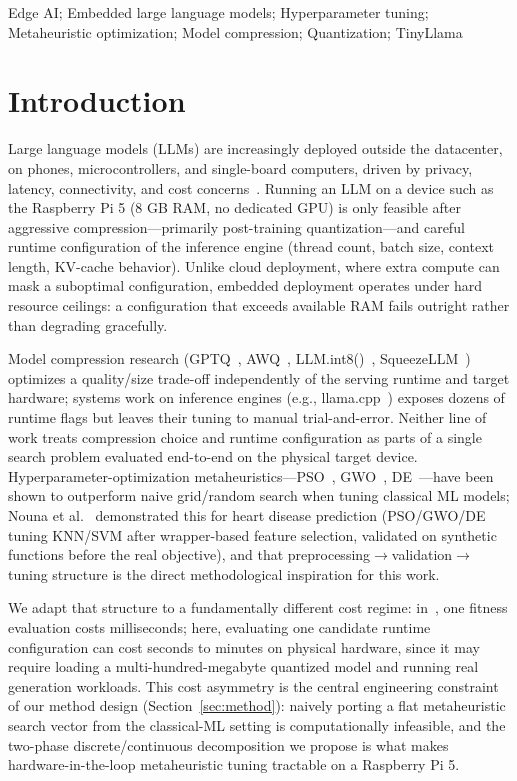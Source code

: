 \documentclass[conference, letterpaper]{IEEEtran}
\begin{document}
\begin{IEEEkeywords}
Edge AI; Embedded large language models; Hyperparameter tuning; Metaheuristic optimization; Model compression; Quantization; TinyLlama
\end{IEEEkeywords}

\section{Introduction}
\label{sec:introduction}

Large language models (LLMs) are increasingly deployed outside the datacenter, on phones, microcontrollers, and single-board computers, driven by privacy, latency, connectivity, and cost concerns~\cite{ref17}. Running an LLM on a device such as the Raspberry Pi 5 (8 GB RAM, no dedicated GPU) is only feasible after aggressive compression---primarily post-training quantization---and careful runtime configuration of the inference engine (thread count, batch size, context length, KV-cache behavior). Unlike cloud deployment, where extra compute can mask a suboptimal configuration, embedded deployment operates under hard resource ceilings: a configuration that exceeds available RAM fails outright rather than degrading gracefully.

Model compression research (GPTQ~\cite{ref4}, AWQ~\cite{ref5}, LLM.int8()~\cite{ref6}, SqueezeLLM~\cite{ref7}) optimizes a quality/size trade-off independently of the serving runtime and target hardware; systems work on inference engines (e.g., llama.cpp~\cite{ref3}) exposes dozens of runtime flags but leaves their tuning to manual trial-and-error. Neither line of work treats compression choice and runtime configuration as parts of a single search problem evaluated end-to-end on the physical target device. Hyperparameter-optimization metaheuristics---PSO~\cite{ref8}, GWO~\cite{ref9}, DE~\cite{ref10}---have been shown to outperform naive grid/random search when tuning classical ML models; Nouna et al.~\cite{ref11} demonstrated this for heart disease prediction (PSO/GWO/DE tuning KNN/SVM after wrapper-based feature selection, validated on synthetic functions before the real objective), and that preprocessing$\rightarrow$validation$\rightarrow$tuning structure is the direct methodological inspiration for this work.

We adapt that structure to a fundamentally different cost regime: in~\cite{ref11}, one fitness evaluation costs milliseconds; here, evaluating one candidate runtime configuration can cost seconds to minutes on physical hardware, since it may require loading a multi-hundred-megabyte quantized model and running real generation workloads. This cost asymmetry is the central engineering constraint of our method design (Section~\ref{sec:method}): naively porting a flat metaheuristic search vector from the classical-ML setting is computationally infeasible, and the two-phase discrete/continuous decomposition we propose is what makes hardware-in-the-loop metaheuristic tuning tractable on a Raspberry Pi 5.
\end{document}
